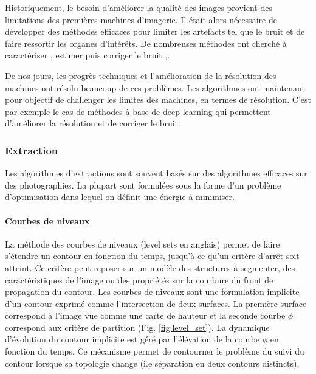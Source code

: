     Historiquement, le besoin d'améliorer la qualité des images provient des limitations des premières machines d'imagerie. Il était alors nécessaire de développer des méthodes efficaces pour limiter les artefacts tel que le bruit et de faire ressortir les organes d'intérêts. De nombreuses méthodes ont cherché à caractériser \cite{Gudbjartsson1995r_Rician_noise_MRI}, estimer \cite{Dietrich2007_measurement_MR_noise} \cite{Gravel_2004_estimate_noise_medical_img} puis corriger le bruit \cite{Krissian_2009_diffusion_MRI},\cite{Mendrik2009_HDCS}.

    De nos jours, les progrès techniques et l'amélioration de la résolution des machines ont résolu beaucoup de ces problèmes. Les algorithmes ont maintenant pour objectif de challenger les limites des machines, en termes de résolution. C'est par exemple le cas de méthodes à base de deep learning \cite{Higaki2019_deep_MRI_CT_quality} qui permettent d'améliorer la résolution et de corriger le bruit.

    \subsubsection{Extraction}
      Les algorithmes d'extractions sont souvent basés sur des algorithmes efficaces sur des photographies. La plupart sont formulées sous la forme d'un problème d'optimisation dans lequel on définit une énergie à minimiser. 
      
      \paragraph{Courbes de niveaux} La méthode des courbes de niveaux (level sets en anglais) permet de faire s'étendre un contour en fonction du temps, jusqu'à ce qu'un critère d'arrêt soit atteint. Ce critère peut reposer sur un modèle des structures à segmenter, des caractéristiques de l'image ou des propriétés sur la courbure du front de propagation du contour. Les courbes de niveaux sont une formulation implicite d'un contour exprimé comme l'intersection de deux surfaces. La première surface correspond à l'image vue comme une carte de hauteur et la seconde courbe $\phi$ correspond aux critère de partition (Fig. \ref{fig:level_set}). La dynamique d'évolution du contour implicite est géré par l'élévation de la courbe $\phi$ en fonction du temps. Ce mécanisme permet de contourner le problème du suivi du contour lorsque sa topologie change (i.e séparation en deux contours distincts).

